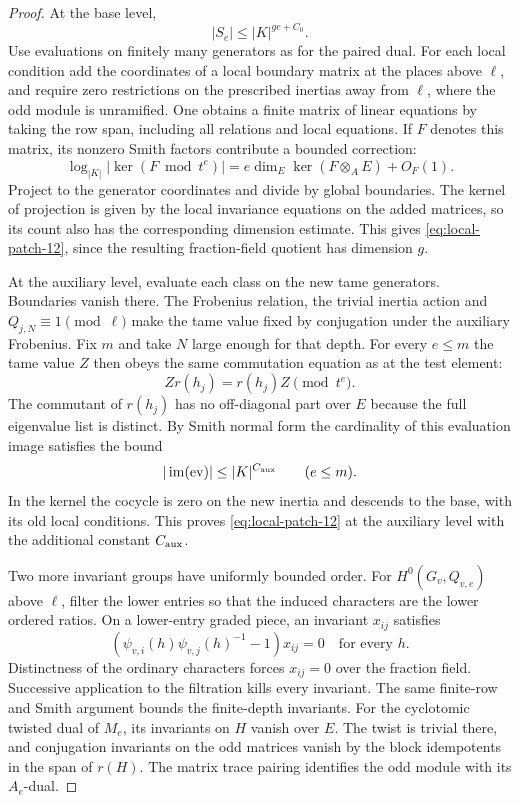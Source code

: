 \begin{proof}
At the base level,
\[
                         |S_e|\le |K|^{ge+C_0}.
 \tag{12}\label{eq:local-patch-12}
\]
Use evaluations on finitely many generators as for
the paired dual. For each local condition add the
coordinates of a local boundary matrix at the
places above \(\ell\), and require zero restrictions
on the prescribed inertias away from \(\ell\), where
the odd module is unramified. One obtains a
finite matrix of linear equations by taking the
row span, including all relations and local
equations. If \(F\) denotes this matrix, its nonzero Smith factors contribute a bounded correction: 
\[
 \log_{|K|}|\ker(F\bmod t^e)|=e\dim_E\ker(F\otimes_A E)+O_F(1).
\]
 Project to the generator
coordinates and divide by global boundaries.
The kernel of projection is given by the local
invariance equations on the added matrices,
so its count also has the corresponding
dimension estimate. This gives \eqref{eq:local-patch-12}, since the
resulting fraction-field quotient has dimension
\(g\).

At the auxiliary level, evaluate each class on
the new tame generators. Boundaries vanish there.
The Frobenius relation, the trivial inertia action
and \(Q_{j,N}\equiv1\pmod\ell\) make the
tame value fixed by conjugation under the
auxiliary Frobenius. Fix \(m\) and take \(N\) large enough for that depth. For every \(e\le m\) the tame value \(Z\) then obeys the same commutation equation as at the test element: 
\[
 Zr(h_j)=r(h_j)Z\pmod {t^e}.
\]
 The commutant of
\(r(h_j)\) has no off-diagonal part over \(E\)
because the full eigenvalue list is distinct.
By Smith normal form the cardinality of this evaluation image satisfies the bound
\[
 |\operatorname{im}({\rm ev})|\le |K|^{C_{\rm aux}}\qquad(e\le m).
\] In the kernel
the cocycle is zero on the new inertia and
descends to the base, with its old local
conditions. This proves \eqref{eq:local-patch-12} at the auxiliary
level with the additional constant \(C_{\rm aux}\).

Two more invariant groups have uniformly bounded
order. For \(H^0(G_v,Q_{v,e})\) above \(\ell\),
filter the lower entries so that the induced
characters are the lower ordered ratios. On a lower-entry graded piece, an invariant \(x_{ij}\) satisfies 
\[
 (\psi_{v,i}(h)\psi_{v,j}(h)^{-1}-1)x_{ij}=0\quad\text{for every }h.
\]
 Distinctness of the ordinary characters forces \(x_{ij}=0\) over the fraction field. Successive application to the filtration kills every invariant. The
same finite-row and Smith argument bounds
the finite-depth invariants. For the
cyclotomic twisted dual of \(M_e\), its invariants
on \(H\) vanish over \(E\). The twist is trivial
there, and conjugation invariants on the odd
matrices vanish by the block idempotents in
the span of \(r(H)\). The matrix trace pairing
identifies the odd module with its \(A_e\)-dual.


\end{proof}
